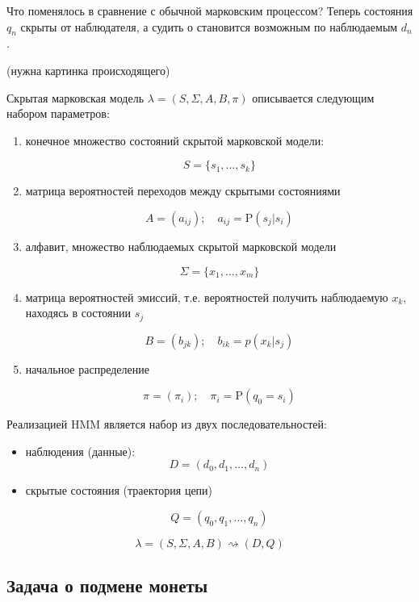 \documentclass[letterpaper, 11pt]{article}
\newcommand{\prob}{\mathrm{P}}
\begin{document}
Что поменялось в сравнение с обычной марковским процессом? Теперь состояния $q_n$ скрыты от наблюдателя, а судить о становится возможным по наблюдаемым $d_n$.

(нужна картинка происходящего)

Скрытая марковская модель $\lambda=(S,\Sigma, A,B, \pi)$ описывается следующим набором параметров:

\begin{enumerate}


\item конечное множество состояний скрытой марковской модели:

$$S=\{s_1,\ldots,s_k\}$$

\item матрица вероятностей переходов между скрытыми состояниями

$$A=(a_{ij}); \quad a_{ij}=\prob(s_j|s_i)$$

\item алфавит, множество наблюдаемых скрытой марковской модели

$$\Sigma=\{x_1,\ldots,x_m\}$$

\item матрица вероятностей эмиссий, т.е. вероятностей получить наблюдаемую $x_k$, находясь в состоянии $s_j$

$$B=(b_{jk});\quad b_{ik}=p(x_k|s_j)$$

\item начальное распределение

$$\pi=(\pi_i);\quad\pi_i=\prob(q_0=s_i)$$

\end{enumerate}


Реализацией HMM является набор из двух последовательностей:

\begin{itemize}

\item наблюдения (данные):
	$$D=(d_0,d_1,\ldots,d_n)$$
	
\item скрытые состояния (траектория цепи)

$$Q=(q_0,q_1,\ldots,q_n)$$

\end{itemize}

$$\lambda=(S,\Sigma, A,B)\rightsquigarrow (D,Q)$$

\subsection{Задача о подмене монеты}
\end{document}
